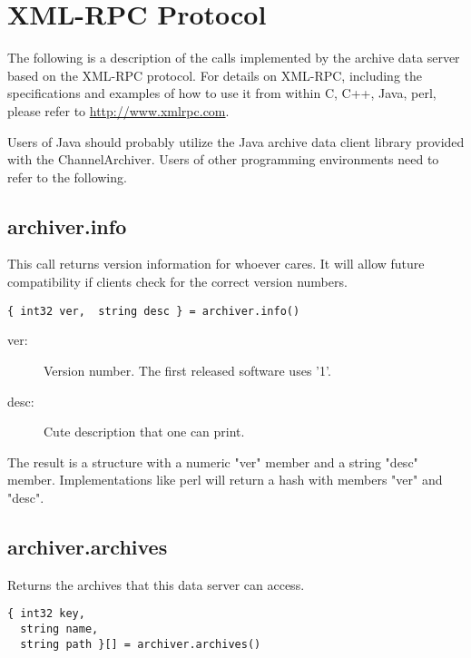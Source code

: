 \section{XML-RPC Protocol} \label{sec:xmlprotocol}
The following is a description of the calls implemented by the archive
data server based on the XML-RPC protocol.
For details on XML-RPC,  including the specifications and examples of
how to use it from within C,  C++, Java, perl, please refer to
\href{http://www.xmlrpc.com}{http://www.xmlrpc.com}.

Users of Java should probably utilize the Java archive data client
library provided with the ChannelArchiver. Users of other programming
environments need to refer to the following.

\subsection{archiver.info} %
This call returns version information for 
whoever cares. It will allow future compatibility
if clients check for the correct version numbers.

\begin{lstlisting}[keywordstyle=\sffamily]
{ int32 ver,  string desc } = archiver.info()
\end{lstlisting}

\begin{description}
\item[\sffamily ver:]  Version number. The first released software uses '1'.
\item[\sffamily desc:] Cute description that one can print.
\end{description}

\noindent The result is a structure with a numeric "ver"
member and a string "desc" member. Implementations
like perl will return a hash with members "ver"
and "desc".

\subsection{archiver.archives} %
Returns the archives that this data server can access.

\begin{lstlisting}[keywordstyle=\sffamily]
{ int32 key, 
  string name, 
  string path }[] = archiver.archives()
\end{lstlisting}

